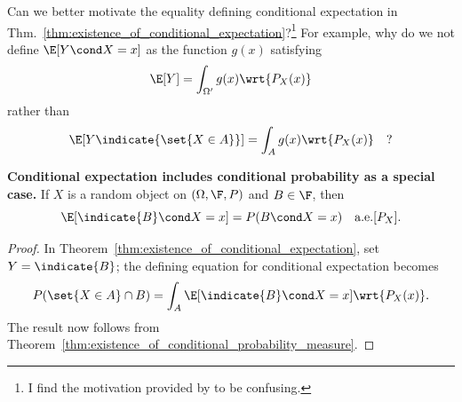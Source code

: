 \documentclass{article} %
\begin{document}
\begin{question}
Can we better motivate the equality defining conditional expectation in Thm.~\ref{thm:existence_of_conditional_expectation}?\footnote{I find the motivation provided by \cite[pp.209, bottom]{ash2000probability} to be confusing.}  For example, why do we not define $\E[Y \cond X=x]$ as the function $g(x)$ satisfying 
\[ \E[Y] = \int_{\Omega'} g(x) \wrt{P_X(x)} \]
rather than 
\[ \E[Y \indicate{\set{X \in A}}] = \int_{A} g(x) \wrt{P_X(x)} \quad ? \]	
\end{question}

\begin{corollary}
\textbf{Conditional expectation includes conditional probability as a special case.}
If $X$ is a random object on $(\Omega, \F, P)$ and $B \in \F$, then 
\[ \E[\indicate{B} \cond X=x] = P(B \cond X=x) \quad \text{a.e.} [P_X]. \]
\end{corollary}

\begin{proof}
In Theorem~\ref{thm:existence_of_conditional_expectation}, set $Y=\indicate{B}$; the defining equation for conditional expectation becomes
\[ P(\set{X \in A} \cap B) = \int_A \E[\indicate{B} \cond X=x] \wrt{P_X(x)}. \]
The result now follows from Theorem~\ref{thm:existence_of_conditional_probability_measure}.
\end{proof}
\end{document}

